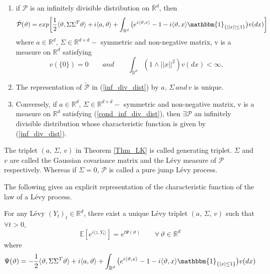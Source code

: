 \begin{theorem} \begin{enumerate}[label=(\roman*)]\label{Thm_LK}
    \item if $\mathcal{P}$ is an infinitely divisible distribution on $\mathbb{R}^d$, then
    \begin{equation}\label{inf_div_dist}
        \tilde{\mathcal{P}}(\vartheta) = exp \bigg[\frac{1}{2}\langle \vartheta, \Sigma \Sigma^T \vartheta \rangle + i\langle a,\vartheta \rangle + \int_{\mathbb{R}^d} \big( e^{i\langle \vartheta,x \rangle } - 1 - {i\langle \vartheta,x \rangle } \mathbbm{1}_{\{||x||\leq1\}} \big) v(dx) \bigg]
    \end{equation}
    where $a \in \mathbb{R}^d$, $\Sigma \in \mathbb{R}^{d \times d}-$ symmetric and non-negative matrix, v is a measure on  $\mathbb{R}^d$ satisfying 
    \begin{equation}\label{cond_inf_div_dist}
        v(\{0\}) = 0 \qquad and \qquad \int_{\mathbb{R}^d} (1 \land ||x||^2)  v(dx)< \infty.
    \end{equation}
    \item The representation of $\tilde{\mathcal{P}}$ in (\ref{inf_div_dist}) by $a, \, \Sigma \, and \, v$ is unique.
    \item Conversely, if $a \in \mathbb{R}^d$, $\Sigma \in \mathbb{R}^{d \times d}-$ symmetric and non-negative matrix, v is a measure on  $\mathbb{R}^d$ satisfying (\ref{cond_inf_div_dist}), then $\exists \mathcal{P}$ an infinitely divisible distribution whose characteristic function is given by (\ref{inf_div_dist}).
\end{enumerate}
\end{theorem}
\begin{definition}
The triplet $(a, \, \Sigma, \, v)$ in Theorem \ref{Thm_LK} is called generating triplet. $\Sigma$ and $v$ are called the Gaussian covariance matrix and the L\'evy measure of $\mathcal{P}$ respectively. Whereas if $\Sigma = 0$, $\mathcal{P}$ is called a pure jump L\'evy process.
\end{definition}

The following gives an explicit representation of the characteristic function of the law of a L\'evy process.
\begin{proposition}
For any L\'evy $(Y_t)_t \in \mathbb{R}^d$, there exist a unique L\'evy triplet $(a, \, \Sigma, \, v)$ such that $\forall t > 0$, 
\begin{equation*}
    \mathbb{E}[e^{i\langle z, Y_t\rangle}] = e^{t\Psi(\vartheta)} \qquad \forall \, \vartheta \in \mathbb{R}^d
\end{equation*}
where
\begin{equation}\label{inf_div_dist_levy}
    \Psi(\vartheta) = -\frac{1}{2}\langle \vartheta, \Sigma \Sigma^T \vartheta \rangle + i\langle a,\vartheta \rangle + \int_{\mathbb{R}^d} \big( e^{i\langle \vartheta,x \rangle } - 1 - {i\langle \vartheta,x \rangle } \mathbbm{1}_{\{|x|\leq1\}} \big) v(dx) 
\end{equation}
\end{proposition}
